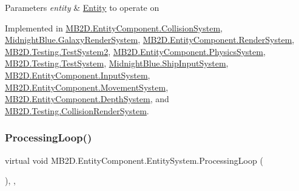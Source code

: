 \begin{DoxyParams}{Parameters}
{\em entity} & \hyperlink{class_m_b2_d_1_1_entity_component_1_1_entity}{Entity} to operate on\\
\hline
\end{DoxyParams}


Implemented in \hyperlink{class_m_b2_d_1_1_entity_component_1_1_collision_system_adfbee070ed7b120565a5f8a08c159535}{M\+B2\+D.\+Entity\+Component.\+Collision\+System}, \hyperlink{class_midnight_blue_1_1_galaxy_render_system_aabbf61a4bcfb7c026d2d0c9fbe90569f}{Midnight\+Blue.\+Galaxy\+Render\+System}, \hyperlink{class_m_b2_d_1_1_entity_component_1_1_render_system_a015ba5b16cc227c7a5a16fcc1ffa73b7}{M\+B2\+D.\+Entity\+Component.\+Render\+System}, \hyperlink{class_m_b2_d_1_1_testing_1_1_test_system2_a0fbdd06fd0de796cfec32b7e025f73fe}{M\+B2\+D.\+Testing.\+Test\+System2}, \hyperlink{class_m_b2_d_1_1_entity_component_1_1_physics_system_ab8398d3b16f49e684f55649877f645c0}{M\+B2\+D.\+Entity\+Component.\+Physics\+System}, \hyperlink{class_m_b2_d_1_1_testing_1_1_test_system_a35d160e6e7e8ffb8f1a6cf403b00ef40}{M\+B2\+D.\+Testing.\+Test\+System}, \hyperlink{class_midnight_blue_1_1_ship_input_system_ac504beb5b6afa47ca4618d9683e46946}{Midnight\+Blue.\+Ship\+Input\+System}, \hyperlink{class_m_b2_d_1_1_entity_component_1_1_input_system_afa241f5c32788fc65587e0443f7217b3}{M\+B2\+D.\+Entity\+Component.\+Input\+System}, \hyperlink{class_m_b2_d_1_1_entity_component_1_1_movement_system_afa730fd9080848ce877206c00a744cdf}{M\+B2\+D.\+Entity\+Component.\+Movement\+System}, \hyperlink{class_m_b2_d_1_1_entity_component_1_1_depth_system_a738556bdf819c9c0d4082a323a502c58}{M\+B2\+D.\+Entity\+Component.\+Depth\+System}, and \hyperlink{class_m_b2_d_1_1_testing_1_1_collision_render_system_af7b7ffdb316533a084e98cbea97a096f}{M\+B2\+D.\+Testing.\+Collision\+Render\+System}.

\hypertarget{class_m_b2_d_1_1_entity_component_1_1_entity_system_a75552787342e68c427bf2e1ffa60ed6c}{}\label{class_m_b2_d_1_1_entity_component_1_1_entity_system_a75552787342e68c427bf2e1ffa60ed6c} 
\subsubsection{\texorpdfstring{Processing\+Loop()}{ProcessingLoop()}}
{\footnotesize\ttfamily virtual void M\+B2\+D.\+Entity\+Component.\+Entity\+System.\+Processing\+Loop (\begin{DoxyParamCaption}{ }\end{DoxyParamCaption})\hspace{0.3cm}{\ttfamily [inline]}, {\ttfamily [protected]}, {\ttfamily [virtual]}}




